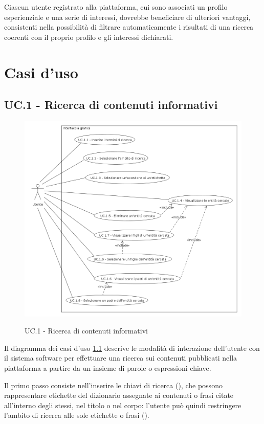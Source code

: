 \documentclass[10pt,a4paper,headinclude,footinclude,hidelinks]{scrreprt} %
\begin{document}
	Ciascun utente registrato alla piattaforma, cui sono associati un profilo esperienziale e una serie di interessi, dovrebbe beneficiare di ulteriori vantaggi, consistenti nella possibilità di filtrare automaticamente i risultati di una ricerca coerenti con il proprio profilo e gli interessi dichiarati.

	\chapter{Casi d'uso}
	\label{ch:stage:ar:uc}

	\section{UC.1 - Ricerca di contenuti informativi}
	\label{ch:stage:ar:uc:1}

	\begin{figure}[ht]
		\begin{center}
	    	\includegraphics[width=12cm]{uc_1.png}
			\label{gfx:uc:1}
			\caption{UC.1 - Ricerca di contenuti informativi}
		\end{center}
	\end{figure}

	Il diagramma dei casi d'uso \ref{gfx:uc:1} descrive le modalità di interazione dell'utente con il sistema software per effettuare una ricerca sui contenuti pubblicati nella piattaforma a partire da un insieme di parole o espressioni chiave.

	Il primo passo consiste nell'inserire le chiavi di ricerca (), che possono rappresentare etichette del dizionario assegnate ai contenuti o frasi citate all'interno degli stessi, nel titolo o nel corpo: l'utente può quindi restringere l'ambito di ricerca alle sole etichette o frasi ().
\end{document}
